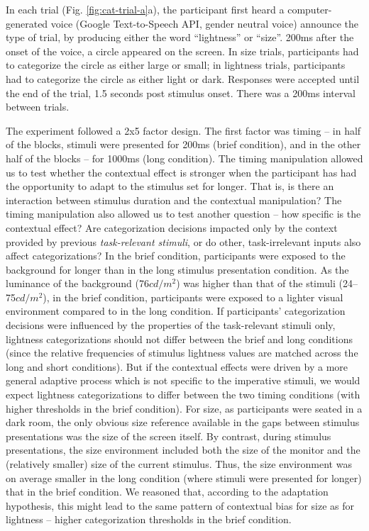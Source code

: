 \documentclass[a4paper, nobind]{templates/ociamthesis}
\begin{document}
In each trial (Fig. \ref{fig:cat-trial-a}a), the participant first heard a computer-generated voice (Google Text-to-Speech API, gender neutral voice) announce the type of trial, by producing either the word ``lightness'' or ``size''. 200ms after the onset of the voice, a circle appeared on the screen. In size trials, participants had to categorize the circle as either large or small; in lightness trials, participants had to categorize the circle as either light or dark. Responses were accepted until the end of the trial, 1.5 seconds post stimulus onset. There was a 200ms interval between trials.

The experiment followed a 2x5 factor design. The first factor was timing -- in half of the blocks, stimuli were presented for 200ms (brief condition), and in the other half of the blocks -- for 1000ms (long condition). The timing manipulation allowed us to test whether the contextual effect is stronger when the participant has had the opportunity to adapt to the stimulus set for longer. That is, is there an interaction between stimulus duration and the contextual manipulation? The timing manipulation also allowed us to test another question -- how specific is the contextual effect? Are categorization decisions impacted only by the context provided by previous \emph{task-relevant stimuli}, or do other, task-irrelevant inputs also affect categorizations? In the brief condition, participants were exposed to the background for longer than in the long stimulus presentation condition. As the luminance of the background (76\(cd/m^2\)) was higher than that of the stimuli (24--75\(cd/m^2\)), in the brief condition, participants were exposed to a lighter visual environment compared to in the long condition. If participants' categorization decisions were influenced by the properties of the task-relevant stimuli only, lightness categorizations should not differ between the brief and long conditions (since the relative frequencies of stimulus lightness values are matched across the long and short conditions). But if the contextual effects were driven by a more general adaptive process which is not specific to the imperative stimuli, we would expect lightness categorizations to differ between the two timing conditions (with higher thresholds in the brief condition). For size, as participants were seated in a dark room, the only obvious size reference available in the gaps between stimulus presentations was the size of the screen itself. By contrast, during stimulus presentations, the size environment included both the size of the monitor and the (relatively smaller) size of the current stimulus. Thus, the size environment was on average smaller in the long condition (where stimuli were presented for longer) that in the brief condition. We reasoned that, according to the adaptation hypothesis, this might lead to the same pattern of contextual bias for size as for lightness -- higher categorization thresholds in the brief condition.
\end{document}
